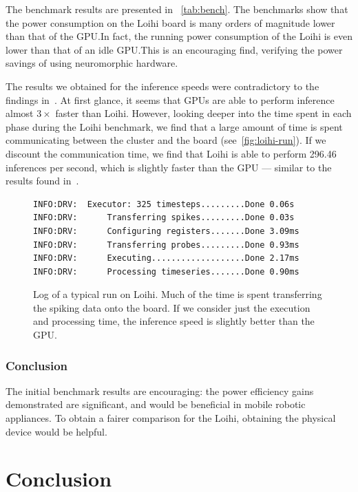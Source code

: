 \documentclass[fyp]{socreport}
\begin{document}
The benchmark results are presented in ~\autoref{tab:bench}. The benchmarks show
that the power consumption on the Loihi board is many orders of magnitude lower
than that of the GPU.\@ In fact, the running power consumption of the Loihi is
even lower than that of an idle GPU.\@ This is an encouraging find, verifying
the power savings of using neuromorphic hardware.

The results we obtained for the inference speeds were contradictory to the
findings in~\cite{blouw18_bench_keywor_spott_effic_neurom_hardw}. At first
glance, it seems that GPUs are able to perform inference almost $3\times$ faster
than Loihi. However, looking deeper into the time spent in each phase during the
Loihi benchmark, we find that a large amount of time is spent communicating
between the cluster and the board (see~\autoref{fig:loihi-run}). If we
discount the communication time, we find that Loihi is able to perform 296.46
inferences per second, which is slightly faster than the GPU --- similar to the
results found in~\cite{blouw18_bench_keywor_spott_effic_neurom_hardw}.

\begin{figure}
\begin{verbatim}
INFO:DRV:  Executor: 325 timesteps.........Done 0.06s
INFO:DRV:      Transferring spikes.........Done 0.03s
INFO:DRV:      Configuring registers.......Done 3.09ms
INFO:DRV:      Transferring probes.........Done 0.93ms
INFO:DRV:      Executing...................Done 2.17ms
INFO:DRV:      Processing timeseries.......Done 0.90ms
\end{verbatim}
  \caption{Log of a typical run on Loihi. Much of the time is spent transferring
    the spiking data onto the board. If we consider just the execution and
    processing time, the inference speed is slightly better than the GPU.}
  \label{fig:loihi-run}
\end{figure}

\subsection{Conclusion}

The initial benchmark results are encouraging: the power efficiency gains
demonstrated are significant, and would be beneficial in mobile robotic
appliances. To obtain a fairer comparison for the Loihi, obtaining the physical
device would be helpful.

\chapter{Conclusion\label{cha:conclusion}}
\end{document}
